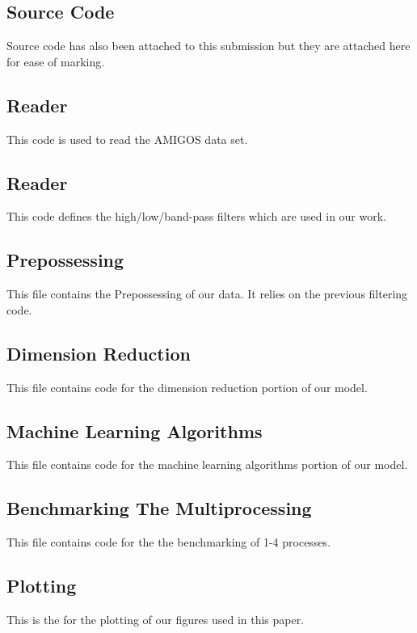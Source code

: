 \clearpage
\onecolumn
\appendix
\begin{appendices}
  \section{Source Code}
  \noindent
  Source code has also been attached to this submission
  but they are attached here for ease of marking.

  \subsection{Reader}
  \noindent
  This code is used to read the AMIGOS data set.
  

  \subsection{Reader}
  \noindent
  This code defines the high/low/band-pass filters
  which are used in our work.
  

  \subsection{Prepossessing}
  \noindent
  This file contains the Prepossessing of our data.
  It relies on the previous filtering code.
  

  \subsection{Dimension Reduction}
  \noindent
  This file contains code for the dimension reduction portion of our model.
  

  \subsection{Machine Learning Algorithms}
  \noindent
  This file contains code for the machine learning algorithms portion of our model.
  

  \subsection{Benchmarking The Multiprocessing}
  \noindent
  This file contains code for the the benchmarking of 1-4 processes.
  

  \subsection{Plotting}
  \noindent
  This is the for the plotting of our figures used in this paper.
  

\end{appendices}
